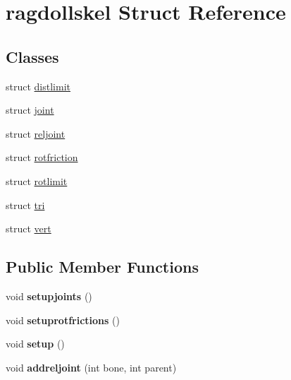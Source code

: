 \hypertarget{structragdollskel}{}\section{ragdollskel Struct Reference}
\label{structragdollskel}
\subsection*{Classes}
\begin{DoxyCompactItemize}
\item 
struct \hyperlink{structragdollskel_1_1distlimit}{distlimit}
\item 
struct \hyperlink{structragdollskel_1_1joint}{joint}
\item 
struct \hyperlink{structragdollskel_1_1reljoint}{reljoint}
\item 
struct \hyperlink{structragdollskel_1_1rotfriction}{rotfriction}
\item 
struct \hyperlink{structragdollskel_1_1rotlimit}{rotlimit}
\item 
struct \hyperlink{structragdollskel_1_1tri}{tri}
\item 
struct \hyperlink{structragdollskel_1_1vert}{vert}
\end{DoxyCompactItemize}
\subsection*{Public Member Functions}
\begin{DoxyCompactItemize}
\item 
\mbox{\label{structragdollskel_aa8c59cf8ba11f920ee149cc1f5a3569b}} 
void {\bfseries setupjoints} ()
\item 
\mbox{\label{structragdollskel_a50d851de5fde5ff7cb48dab73e4839e2}} 
void {\bfseries setuprotfrictions} ()
\item 
\mbox{\label{structragdollskel_a153825dea064e8d5e8a860272815fc26}} 
void {\bfseries setup} ()
\item 
\mbox{\label{structragdollskel_a99fb611dfd0d8fbf635d8a41f7a650b3}} 
void {\bfseries addreljoint} (int bone, int parent)
\end{DoxyCompactItemize}
